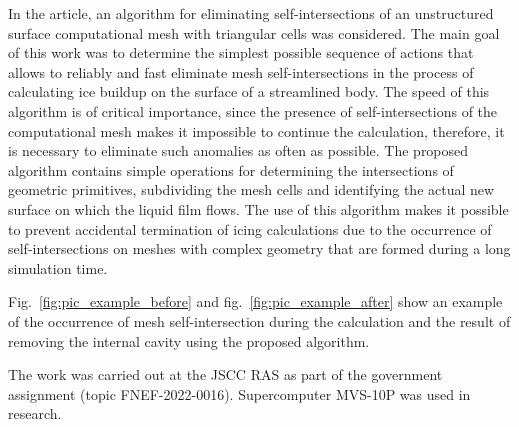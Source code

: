 \documentclass[
11pt,%
tightenlines,%
twoside,%
onecolumn,%
nofloats,%
nobibnotes,%
nofootinbib,%
superscriptaddress,%
noshowpacs,%
centertags]%
{revtex4}
\begin{document}
In the article, an algorithm for eliminating self-intersections of an unstructured surface computational mesh with triangular cells was considered.
The main goal of this work was to determine the simplest possible sequence of actions that allows to reliably and fast eliminate mesh self-intersections in the process of calculating ice buildup on the surface of a streamlined body.
The speed of this algorithm is of critical importance, since the presence of self-intersections of the computational mesh makes it impossible to continue the calculation, therefore, it is necessary to eliminate such anomalies as often as possible.
The proposed algorithm contains simple operations for determining the intersections of geometric primitives, subdividing the mesh cells and identifying the actual new surface on which the liquid film flows.
The use of this algorithm makes it possible to prevent accidental termination of icing calculations due to the occurrence of self-intersections on meshes with complex geometry that are formed during a long simulation time.

Fig.~\ref{fig:pic_example_before} and fig.~\ref{fig:pic_example_after} show an example of the occurrence of mesh self-intersection during the calculation and the result of removing the internal cavity using the proposed algorithm.

\begin{acknowledgments}
The work was carried out at the JSCC RAS as part of the government assignment (topic FNEF-2022-0016). Supercomputer MVS-10P was used in research.
\end{acknowledgments}
\end{document}

